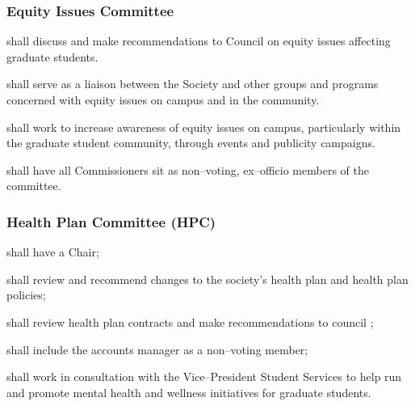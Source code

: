 \subsubsection{Equity Issues Committee} 
\begin{longenum}[ label*=\thesubsubsection.\arabic*., align=left]
	\item shall discuss and make recommendations to Council on equity issues affecting graduate students.
    \item shall serve as a liaison between the Society and other groups and programs concerned with equity issues on campus and in the community.
    \item shall work to increase awareness of equity issues on campus, particularly within the graduate student community, through events and publicity campaigns.
    \item shall have all Commissioners sit as non--voting, ex--officio members of the committee.
    
\end{longenum}

\subsubsection{Health Plan Committee (HPC)} 
\begin{longenum}[ label*=\thesubsubsection.\arabic*., align=left]
	\item shall have a Chair;
    \item shall review and recommend changes to the society's health plan and health plan policies; 
    \item shall review health plan contracts and make recommendations to council ;
    \item shall include the accounts manager as a non--voting member;
    \item shall work in consultation with the Vice--President Student Services to help run and promote mental health and wellness initiatives for graduate students. 
    
\end{longenum}

